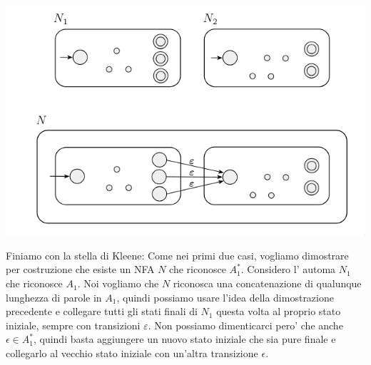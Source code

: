 \begin{center}
  \includegraphics[scale=0.3]{img/2024-12-16-18-35-25.png}
\end{center}

Finiamo con la stella di Kleene:
Come nei primi due casi, vogliamo dimostrare per costruzione che esiste un NFA $ N $ che riconosce $ A_1^* $. Considero l' automa $ N_1 $ che riconosce $ A_1 $. Noi vogliamo che $ N $ riconosca una concatenazione di qualunque lunghezza di parole in $ A_1 $, quindi possiamo usare l'idea della dimostrazione precedente e collegare tutti gli stati finali di $ N_1 $ questa volta al proprio stato iniziale, sempre con transizioni $ \varepsilon $. Non possiamo dimenticarci pero' che anche $ \epsilon \in A_1^* $, quindi basta aggiungere un nuovo stato iniziale che sia pure finale e collegarlo al vecchio stato iniziale con un'altra transizione $ \epsilon $.

